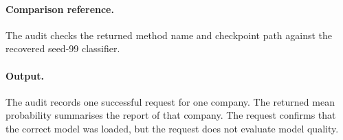 \paragraph{Comparison reference.} The audit checks the returned method name and checkpoint path against the recovered seed-99 classifier.

\paragraph{Output.} The audit records one successful request for one company. The returned mean probability summarises the report of that company. The request confirms that the correct model was loaded, but the request does not evaluate model quality.